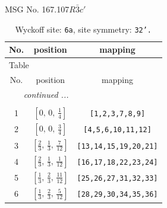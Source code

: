 \documentclass[fleqn,8pt]{jsarticle}
\begin{document}
\setcounter{MaxMatrixCols}{32}

\renewcommand{\tablename}{Table~}
\renewcommand{\figurename}{Figure~}
\begin{center}
\LARGE
MSG No. 167.107\quad$R\bar{3}c'$
\end{center}
\renewcommand{\arraystretch}{1.2}
\begin{longtable}{ccc}
\caption{Wyckoff site: {\tt 6a}, site symmetry: {\tt 32'.}}
 \\
 \hline \hline
No. & position & mapping \\ \hline \endfirsthead

\multicolumn{2}{l}{\tablename\ \thetable{}} \\
 \hline \hline
No. & position & mapping \\ \hline \endhead

 \hline \hline
\multicolumn{2}{r}{\footnotesize\it continued ...} \\ \endfoot

 \hline \hline
\multicolumn{2}{r}{} \\ \endlastfoot

1 & $\left[ 0,\, 0,\, \frac{1}{4} \right]$ & {\tt [1,2,3,7,8,9]} \\ \hline
2 & $\left[ 0,\, 0,\, \frac{3}{4} \right]$ & {\tt [4,5,6,10,11,12]} \\ \hline
3 & $\left[ \frac{2}{3},\, \frac{1}{3},\, \frac{7}{12} \right]$ & {\tt [13,14,15,19,20,21]} \\ \hline
4 & $\left[ \frac{2}{3},\, \frac{1}{3},\, \frac{1}{12} \right]$ & {\tt [16,17,18,22,23,24]} \\ \hline
5 & $\left[ \frac{1}{3},\, \frac{2}{3},\, \frac{11}{12} \right]$ & {\tt [25,26,27,31,32,33]} \\ \hline
6 & $\left[ \frac{1}{3},\, \frac{2}{3},\, \frac{5}{12} \right]$ & {\tt [28,29,30,34,35,36]} \\
\end{longtable}
\renewcommand{\arraystretch}{1.2}
\end{document}
